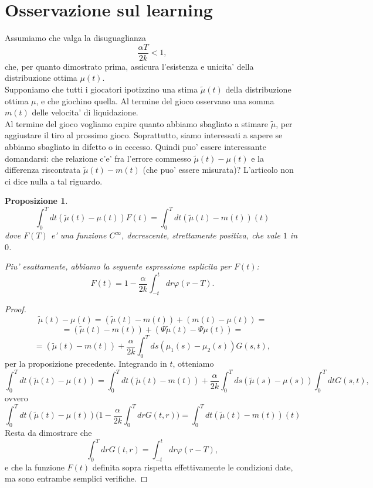 \documentclass[a4paper]{book}
\theoremstyle{plain}
\newtheorem{prop}[thm]{Proposizione}
\theoremstyle{definizione}
\theoremstyle{remark}
\numberwithin{equation}{section}
\begin{document}
	\section{Osservazione sul learning}
	
	Assumiamo che valga la disuguaglianza $$\frac{\alpha T}{2k}<1,$$ che, per quanto dimostrato prima, assicura l'esistenza e unicita' della distribuzione ottima $\mu(t)$.
	\\
	
	Supponiamo che tutti i giocatori ipotizzino una stima $\tilde\mu(t)$ della distribuzione ottima $\mu$, e che giochino quella. Al termine del gioco osservano una somma $m(t)$ delle velocita' di liquidazione. 
	\\
	
	Al termine del gioco vogliamo capire quanto abbiamo sbagliato a stimare $\tilde\mu$, per aggiustare il tiro al prossimo gioco. Soprattutto, siamo interessati a sapere se abbiamo sbagliato in difetto o in eccesso. Quindi puo' essere interessante domandarsi: che relazione c'e' fra l'errore commesso $\tilde\mu(t)-\mu(t)$ e la differenza riscontrata $\tilde\mu(t)-m(t)$ (che puo' essere misurata)? L'articolo non ci dice nulla a tal riguardo. 
	
	\begin{prop}
	$$\int_0^Tdt (\tilde\mu(t)-\mu(t))F(t)=\int_0^Tdt (\tilde\mu(t)-m(t))(t)$$
	dove $F(T)$ e' una funzione $C^\infty$, decrescente, strettamente positiva, che vale $1$ in $0$.
	
	Piu' esattamente, abbiamo la seguente espressione esplicita per $F(t)$:
	$$F(t)=1-\frac{\alpha}{2k}\int_{-t}^tdr\varphi(r-T).$$
	\end{prop}
	\begin{proof}
	$$\tilde\mu(t)-\mu(t)=(\tilde\mu(t)-m(t))+(m(t)-\mu(t))=$$
	$$=(\tilde\mu(t)-m(t))+(\Psi\tilde\mu(t)-\Psi\mu(t))=$$
	$$=(\tilde\mu(t)-m(t))+\frac{\alpha}{2k}\int_0^T ds (\mu_1(s)-\mu_2(s))G(s,t),$$
	per la proposizione precedente. Integrando in $t$, otteniamo
	$$\int_0^T dt (\tilde\mu(t)-\mu(t))=\int_0^T dt(\tilde\mu(t)-m(t))+\frac{\alpha}{2k}\int_0^T ds (\tilde\mu(s)-\mu(s))\int_0^T dt G(s,t),$$ ovvero 
	$$\int_0^Tdt (\tilde\mu(t)-\mu(t)) \bigg(1-\frac{\alpha}{2k}\int_{0}^TdrG(t,r)\bigg)=\int_0^Tdt (\tilde\mu(t)-m(t))(t)$$
	Resta da dimostrare che $$\int_{0}^TdrG(t,r)=\int_{-t}^tdr\varphi(r-T),$$ e che la funzione $F(t)$ definita sopra rispetta effettivamente le condizioni date, ma sono entrambe semplici verifiche.
	
	\end{proof}
	
\end{document}
